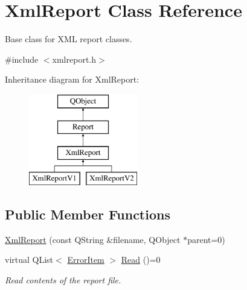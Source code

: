 \hypertarget{class_xml_report}{\section{Xml\-Report Class Reference}
\label{class_xml_report}
}


Base class for X\-M\-L report classes.  




{\ttfamily \#include $<$xmlreport.\-h$>$}

Inheritance diagram for Xml\-Report\-:\begin{figure}[H]
\begin{center}
\leavevmode
\includegraphics[height=4.000000cm]{class_xml_report}
\end{center}
\end{figure}
\subsection*{Public Member Functions}
\begin{DoxyCompactItemize}
\item 
\hyperlink{class_xml_report_aa8100fa163c4002f5c0902635f32a69b}{Xml\-Report} (const Q\-String \&filename, Q\-Object $\ast$parent=0)
\item 
virtual Q\-List$<$ \hyperlink{class_error_item}{Error\-Item} $>$ \hyperlink{class_xml_report_a2ee0964329a242d406c37a4bbb23fff0}{Read} ()=0
\begin{DoxyCompactList}\small\item\em Read contents of the report file. \end{DoxyCompactList}\end{DoxyCompactItemize}
